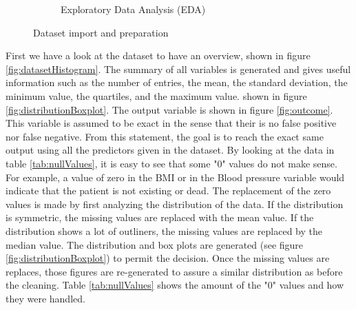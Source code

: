 \documentclass[11pt]{article}
\begin{document}
\begin{figure}[H]
\begin{subfigure}[b]{0.49\textwidth}
			\caption{Exploratory Data Analysis (EDA)}   
			\label{methodseda}
		\end{subfigure}        
		\caption{Dataset import and preparation}

	\end{figure}

	

	First we have a look at the dataset to have an overview, shown in figure \ref{fig:datasetHistogram}. The summary of all variables is generated and gives useful information such as the number of entries, the mean, the standard deviation, the minimum value, the quartiles, and the maximum value. shown in figure \ref{fig:distributionBoxplot}.
	\medbreak
	The output variable is shown in figure \ref{fig:outcome}. This variable is assumed to be exact in the sense that their is no false positive nor false negative. From this statement, the goal is to reach the exact same output using all the predictors given in the dataset.
	\medbreak
	By looking at the data in table \ref{tab:nullValues}, it is easy to see that some "0" values do not make sense. For example, a value of zero in the BMI or in the Blood pressure variable would indicate that the patient is not existing or dead. The replacement of the zero values is made by first analyzing the distribution of the data. If the distribution is symmetric, the missing values are replaced with the mean value. If the distribution shows a lot of outliners, the missing values are replaced by the median value. The distribution and box plots are generated (see figure \ref{fig:distributionBoxplot}) to permit the decision. Once the missing values are replaces, those figures are re-generated to assure a similar distribution as before the cleaning. Table \ref{tab:nullValues} shows the amount of the "0" values and how they were handled.
\end{document}
